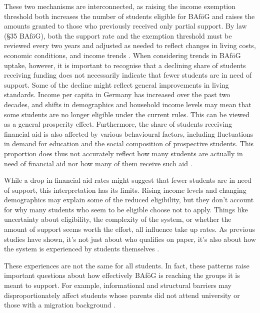 These two mechanisms are interconnected, as raising the income exemption threshold both increases the number of students eligible for BAföG and raises the amounts granted to those who previously received only partial support. By law (§35 BAföG), both the support rate and the exemption threshold must be reviewed every two years and adjusted as needed to reflect changes in living costs, economic conditions, and income trends \citep{bafoeg_law, meier_zur_2024}.
When considering trends in BAföG uptake, however, it is important to recognise that a declining share of students receiving funding does not necessarily indicate that fewer students are in need of support. Some of the decline might reflect general improvements in living standards. Income per capita in Germany has increased over the past two decades, and shifts in demographics and household income levels may mean that some students are no longer eligible under the current rules. This can be viewed as a general prosperity effect. Furthermore, the share of students receiving financial aid is also affected by various behavioural factors, including fluctuations in demand for education and the social composition of prospective students. This proportion does thus not accurately reflect how many students are actually in need of financial aid nor how many of them receive such aid \citep{meier_bafog_2024, meier_zur_2024}.

While a drop in financial aid rates might suggest that fewer students are in need of support, this interpretation has its limits. Rising income levels and changing demographics may explain some of the reduced eligibility, but they don't account for why many students who seem to be eligible choose not to apply. Things like uncertainty about eligibility, the complexity of the system, or whether the amount of support seems worth the effort, all influence take up rates. As previous studies have shown, it’s not just about who qualifies on paper, it’s also about how the system is experienced by students themselves \citep{meier_bafog_2024, meier_zur_2024}.

These experiences are not the same for all students. In fact, these patterns raise important questions about how effectively BAföG is reaching the groups it is meant to support. For example, informational and structural barriers may disproportionately affect students whose parents did not attend university or those with a migration background \citep{kroher_studierendenbefragung_2023}.

